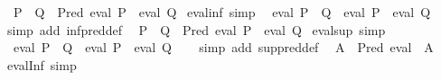 \begin{isabellebody}
%
\isadelimproof
\isanewline
%
\endisadelimproof
\isanewline
{}\isamarkupfalse%
\isanewline
\ \ {\isachardoublequoteopen}P\ {\isasymsqinter}\ Q\ {\isacharequal}{\kern0pt}\ Pred\ {\isacharparenleft}{\kern0pt}eval\ P\ {\isasymsqinter}\ eval\ Q{\isacharparenright}{\kern0pt}{\isachardoublequoteclose}\isanewline
\isanewline
{}\isamarkupfalse%
\ eval{\isacharunderscore}{\kern0pt}inf\ {\isacharbrackleft}{\kern0pt}simp{\isacharbrackright}{\kern0pt}{\isacharcolon}{\kern0pt}\isanewline
\ \ {\isachardoublequoteopen}eval\ {\isacharparenleft}{\kern0pt}P\ {\isasymsqinter}\ Q{\isacharparenright}{\kern0pt}\ {\isacharequal}{\kern0pt}\ eval\ P\ {\isasymsqinter}\ eval\ Q{\isachardoublequoteclose}\isanewline
%
\isadelimproof
\ \ %
\endisadelimproof
%
\isatagproof
{}\isamarkupfalse%
\ {\isacharparenleft}{\kern0pt}simp\ add{\isacharcolon}{\kern0pt}\ inf{\isacharunderscore}{\kern0pt}pred{\isacharunderscore}{\kern0pt}def{\isacharparenright}{\kern0pt}%
\endisatagproof
{\isafoldproof}%
%
\isadelimproof
\isanewline
%
\endisadelimproof
\isanewline
{}\isamarkupfalse%
\isanewline
\ \ {\isachardoublequoteopen}P\ {\isasymsqunion}\ Q\ {\isacharequal}{\kern0pt}\ Pred\ {\isacharparenleft}{\kern0pt}eval\ P\ {\isasymsqunion}\ eval\ Q{\isacharparenright}{\kern0pt}{\isachardoublequoteclose}\isanewline
\isanewline
{}\isamarkupfalse%
\ eval{\isacharunderscore}{\kern0pt}sup\ {\isacharbrackleft}{\kern0pt}simp{\isacharbrackright}{\kern0pt}{\isacharcolon}{\kern0pt}\isanewline
\ \ {\isachardoublequoteopen}eval\ {\isacharparenleft}{\kern0pt}P\ {\isasymsqunion}\ Q{\isacharparenright}{\kern0pt}\ {\isacharequal}{\kern0pt}\ eval\ P\ {\isasymsqunion}\ eval\ Q{\isachardoublequoteclose}\isanewline
%
\isadelimproof
\ \ %
\endisadelimproof
%
\isatagproof
{}\isamarkupfalse%
\ {\isacharparenleft}{\kern0pt}simp\ add{\isacharcolon}{\kern0pt}\ sup{\isacharunderscore}{\kern0pt}pred{\isacharunderscore}{\kern0pt}def{\isacharparenright}{\kern0pt}%
\endisatagproof
{\isafoldproof}%
%
\isadelimproof
\isanewline
%
\endisadelimproof
\isanewline
{}\isamarkupfalse%
\isanewline
\ \ {\isachardoublequoteopen}{\isasymSqinter}A\ {\isacharequal}{\kern0pt}\ Pred\ {\isacharparenleft}{\kern0pt}{\isasymSqinter}{\isacharparenleft}{\kern0pt}eval\ {\isacharbackquote}{\kern0pt}\ A{\isacharparenright}{\kern0pt}{\isacharparenright}{\kern0pt}{\isachardoublequoteclose}\isanewline
\isanewline
{}\isamarkupfalse%
\ eval{\isacharunderscore}{\kern0pt}Inf\ {\isacharbrackleft}{\kern0pt}simp{\isacharbrackright}{\kern0pt}{\isacharcolon}{\kern0pt}\isanewline

\end{isabellebody}
